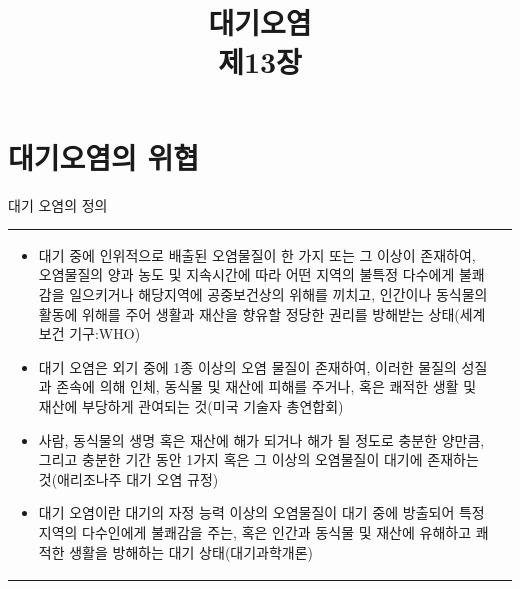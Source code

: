 \title[]{대기오염\\\small{제13장}}

\begin{frame}[plain] %
	\titlepage
\end{frame}


\section{대기오염의 위협}


\begin{frame}[t]{대기 오염의 정의}
	\begin{tabular}{ll}
		\begin{minipage}[t]{0.94\textwidth}\scriptsize
			\begin{itemize}
				\item 대기 중에 인위적으로 배출된 오염물질이 한 가지 또는 그 이상이 존재하여, 오염물질의 양과 농도 및 지속시간에 따라 어떤 지역의 불특정 다수에게 불쾌감을 일으키거나 해당지역에 공중보건상의 위해를 끼치고, 인간이나 동식물의 활동에 위해를 주어 생활과 재산을 향유할 정당한 권리를 방해받는 상태(세계보건 기구:WHO)
				\item 대기 오염은 외기 중에 1종 이상의 오염 물질이 존재하여, 이러한 물질의 성질과 존속에 의해 인체, 동식물 및 재산에 피해를 주거나, 혹은 쾌적한 생활 및 재산에 부당하게 관여되는 것(미국 기술자 총연합회)
				\item 사람, 동식물의 생명 혹은 재산에 해가 되거나 해가 될 정도로 충분한 양만큼, 그리고 충분한 기간 동안 1가지 혹은 그 이상의 오염물질이 대기에 존재하는 것(애리조나주 대기 오염 규정)
				\item 대기 오염이란 대기의 자정 능력 이상의 오염물질이 대기 중에 방출되어 특정 지역의 다수인에게 불쾌감을 주는, 혹은 인간과 동식물 및 재산에 유해하고 쾌적한 생활을 방해하는 대기 상태(대기과학개론)					
			\end{itemize}

		\end{minipage}	
		&
		\begin{minipage}[t]{0.01\textwidth} \scriptsize	
			
		\end{minipage}
	\end{tabular}
\end{frame}



